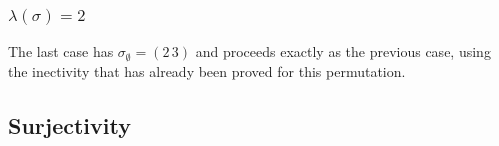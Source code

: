 \subsubsection{$\lambda(\sigma) = 2$}

The last case has $\sigma_{\emptyset} = (2\,3)$ and proceeds exactly
as the previous case, using the inectivity that has already been
proved for this permutation.

\subsection{Surjectivity}









